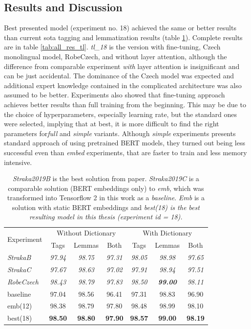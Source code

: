 \subsection{Results and Discussion}
Best presented model (experiment no. 18) achieved the same or better results than current \acrlong{sota} tagging and lemmatization results (table \ref{tab:all_prew}). Complete results are in table \ref{tab:all_res_tl}. \textit{tl\_18} is the version with fine-tuning, Czech monolingual model, RobeCzech, and without layer attention, although the difference from comparable experiment \textit{with} layer attention is insignificant and can be just accidental. The dominance of the Czech model was expected and additional expert knowledge contained in the complicated architecture was also assumed to be better. Experiments also showed that fine-tuning approach achieves better results than full training from the beginning. This may be due to the choice of hyperparameters, especially learning rate, but the standard ones were selected, implying that at best, it is more difficult to find the right parameters for\textit{full} and \textit{simple} variants. Although \textit{simple} experiments presents standard approach of using pretrained BERT models, they turned out being less successful even than \textit{embed} experiments, that are faster to train and less memory intensive. 

\begin{table}[!h]
\centering
  \begin{tabular}{|l||ccc||ccc|}
  \hline
\multirow{2}{*}{Experiment} & \multicolumn{3}{c||}{Without Dictionary}  &
      \multicolumn{3}{c|}{With Dictionary} \\ 
    & Tags & Lemmas & Both & Tags & Lemmas & Both \\ \hline \hline
    \textit{StrakaB} & \textit{97.94} & \textit{98.75} & \textit{97.31} & \textit{98.05} & \textit{98.98} & \textit{97.65 }\\ \hline
   \textit{ StrakaC} & \textit{97.67} & \textit{98.63} & \textit{97.02} & \textit{97.91 }& \textit{98.94} & \textit{97.51} \\ \hline
     \textit{RobeCzech} & \textit{98.43} & \textit{98.79}  & \textit{97.83}  & \textit{98.50} & \textit{\textbf{99.00}}  & \textit{98.11} \\ \hline \hline
      baseline & 97.04  & 98.56  & 96.41 &  97.31   & 98.83  & 96.90 \\ \hline 
    emb(12) & 98.38  &98.79  & 97.80 & 98.48  & 98.99 & 98.10 \\ \hline
    best(18) & \textbf{98.50}  & \textbf{98.80} &\textbf{ 97.90}  & \textbf{98.57}  & \textbf{99.00}  & \textbf{98.19}  \\ \hline  
  \end{tabular}
  \caption{%
  \textit{Straka2019B} is the best solution from \citep{Straka2019} paper. \textit{Straka2019C} is a comparable solution  (BERT embeddings only) to \textit{emb}, which was transformed into Tensorflow 2 in this work as a \textit{baseline}. \textit{Emb} is a solution with static BERT embeddings and \textit{best(18) is the best resulting model in this thesis (experiment id = 18). }}
\label{tab:all_prew} 
\end{table}

